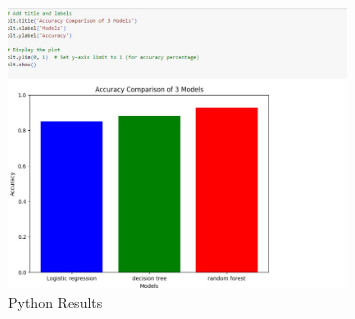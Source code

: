 \documentclass[a4paper,12pt]{article}
\begin{document}
\begin{figure}[h!]
    \centering
    \includegraphics[width=0.8\textwidth]{results.jpg} %
    \caption{Python Results}
\end{figure}

\end{document}
